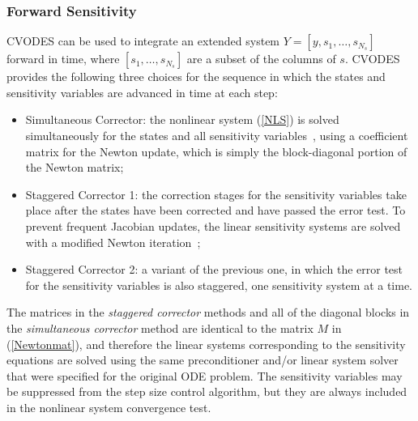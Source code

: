 \subsubsection{Forward Sensitivity}
CVODES can be used to integrate an extended system
$Y = [y,s_1,\ldots,s_{N_s}]$ forward in time, where
$[s_1,\ldots,s_{N_s}]$ are a subset of the columns of $s$.
%
CVODES provides the following three choices for the sequence in which
the states and sensitivity variables are advanced in time at each step:
%
\begin{itemize}
\item Simultaneous Corrector: the nonlinear system (\ref{NLS}) is solved
  simultaneously for the states and all sensitivity variables~\cite{MaPe:96},
  using a coefficient matrix for the Newton update, which is
  simply the block-diagonal portion of the Newton matrix;
\item Staggered Corrector 1: the correction stages for the sensitivity
  variables take place after the states have been corrected and have passed
  the error test. To prevent frequent Jacobian updates, the linear sensitivity
  systems are solved with a modified Newton iteration~\cite{FTB:97};
\item Staggered Corrector 2: a variant of the previous one,
  in which the error test for the sensitivity variables is also staggered,
  one sensitivity system at a time.
\end{itemize}
%
The matrices in the {\em staggered corrector} methods and all of the
diagonal blocks in the {\em simultaneous corrector} method are
identical to the matrix $M$ in (\ref{Newtonmat}), and
therefore the linear systems corresponding to the sensitivity equations
are solved using the same preconditioner and/or linear system solver that
were specified for the original ODE problem.
The sensitivity variables may be suppressed from the step size control
algorithm, but they are always included in the nonlinear system convergence
test.

